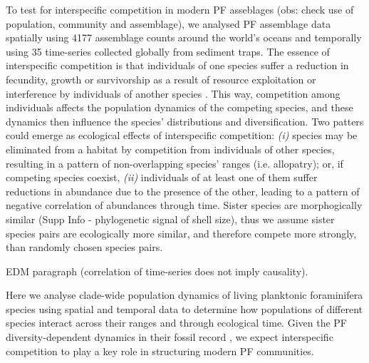 \documentclass[a4paper]{article}
\begin{document}

To test for interspecific competition in modern PF asseblages (obs: check use of population, community and assemblage), we analysed PF assemblage data spatially using 4177 assemblage counts around the world's oceans and temporally using 35 time-series collected globally from sediment traps. 
The essence of interspecific competition is that individuals of one species suffer a reduction in fecundity, growth or survivorship as a result of resource exploitation or interference by individuals of another species \citep{begon2006ecology}. This way, competition among individuals affects the population dynamics of the competing species, and these dynamics then influence the species' distributions and diversification. 
Two patters could emerge as ecological effects of interspecific competition: \textit{(i)} species may be eliminated from a habitat by competition from individuals of other species, resulting in a pattern of non-overlapping species’ ranges (i.e. allopatry); or, if competing species coexist, \textit{(ii)} individuals of at least one of them suffer reductions in abundance due to the presence of the other, leading to a pattern of negative correlation of abundances through time.
Sister species are morphogically similar (Supp Info - phylogenetic signal of shell size), thus we assume sister species pairs are ecologically more similar, and therefore compete more strongly, than randomly chosen species pairs. 


EDM paragraph (correlation of time-series does not imply causality).



Here we analyse clade-wide population dynamics of living planktonic foraminifera species using spatial and temporal data to determine how populations of different species interact across their ranges and through ecological time. Given the PF diversity-dependent dynamics in their fossil record \citep{ezard2011interplay, ezard2016ecolet}, we expect interspecific competition to play a key role in structuring modern PF communities. 
\end{document}

